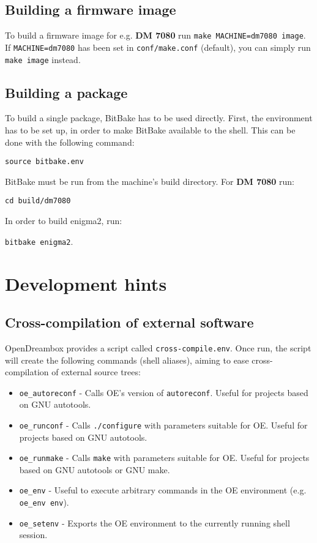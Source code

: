\documentclass[a4paper]{article}
\newcommand{\shell}[1]{\texttt{\small #1}}
\begin{document}
  \subsection{Building a firmware image}
     To build a firmware image for e.g. \textbf{DM 7080} run \shell{make MACHINE=dm7080 image}.
     If \shell{MACHINE=dm7080} has been set in \shell{conf/make.conf} (default), you can simply run
     \shell{make image} instead.

  \subsection{Building a package}
     To build a single package, BitBake has to be used directly. First, the environment
     has to be set up, in order to make BitBake available to the shell. This can be done
     with the following command:

     \shell{source bitbake.env}

     BitBake must be run from the machine's build directory. For \textbf{DM 7080} run:

     \shell{cd build/dm7080}

     In order to build enigma2, run:

     \shell{bitbake enigma2}.

\section{Development hints}

  \subsection{Cross-compilation of external software}
    OpenDreambox provides a script called \shell{cross-compile.env}. Once run, the script will create
    the following commands (shell aliases), aiming to ease cross-compilation of external source trees:

    \begin{itemize}
      \item \shell{oe\_autoreconf} - Calls OE's version of \shell{autoreconf}. Useful for projects based on GNU autotools.
      \item \shell{oe\_runconf} - Calls \shell{./configure} with parameters suitable for OE. Useful for projects based on GNU autotools.
      \item \shell{oe\_runmake} - Calls \shell{make} with parameters suitable for OE. Useful for projects based on GNU autotools or GNU make.
      \item \shell{oe\_env} - Useful to execute arbitrary commands in the OE environment (e.g. \shell{oe\_env env}).
      \item \shell{oe\_setenv} - Exports the OE environment to the currently running shell session.
    \end{itemize}
\end{document}
